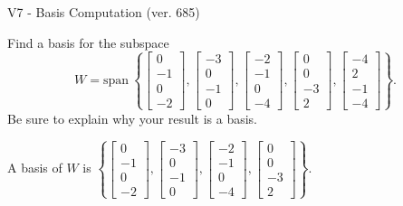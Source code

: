 \begin{exercise}
  \begin{exerciseTitle}V7 - Basis Computation (ver. 685)\end{exerciseTitle}
  \begin{exerciseStatement}
    Find a basis for the subspace 
\[W=\mathrm{span}\ \left\{\left[\begin{array}{r}
0 \\
-1 \\
0 \\
-2
\end{array}\right] , \left[\begin{array}{r}
-3 \\
0 \\
-1 \\
0
\end{array}\right] , \left[\begin{array}{r}
-2 \\
-1 \\
0 \\
-4
\end{array}\right] , \left[\begin{array}{r}
0 \\
0 \\
-3 \\
2
\end{array}\right] , \left[\begin{array}{r}
-4 \\
2 \\
-1 \\
-4
\end{array}\right]\right\}.\]
 Be sure to explain why your result is a basis.


  \end{exerciseStatement}
  \begin{exerciseAnswer}
   A basis of \(W\) is  \(\left\{\left[\begin{array}{r}
0 \\
-1 \\
0 \\
-2
\end{array}\right] , \left[\begin{array}{r}
-3 \\
0 \\
-1 \\
0
\end{array}\right] , \left[\begin{array}{r}
-2 \\
-1 \\
0 \\
-4
\end{array}\right] , \left[\begin{array}{r}
0 \\
0 \\
-3 \\
2
\end{array}\right]\right\}\).
  


  \end{exerciseAnswer}
\end{exercise}